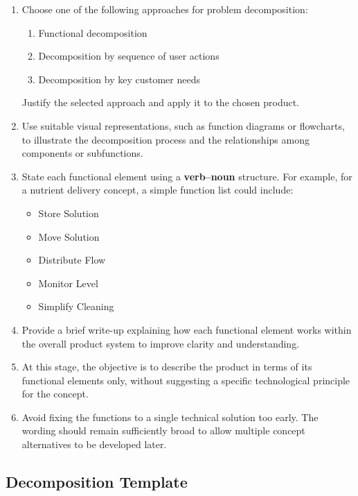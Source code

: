 \begin{enumerate}
    \item Choose one of the following approaches for problem decomposition:
    \begin{enumerate}
        \item Functional decomposition
        \item Decomposition by sequence of user actions
        \item Decomposition by key customer needs
    \end{enumerate}
    Justify the selected approach and apply it to the chosen product.

    \item Use suitable visual representations, such as function diagrams or flowcharts, to illustrate the decomposition process and the relationships among components or subfunctions.

    \item State each functional element using a \textbf{verb--noun} structure. For example, for a nutrient delivery concept, a simple function list could include:
    \begin{itemize}
        \item Store Solution
        \item Move Solution
        \item Distribute Flow
        \item Monitor Level
        \item Simplify Cleaning
    \end{itemize}

    \item Provide a brief write-up explaining how each functional element works within the overall product system to improve clarity and understanding.

    \item At this stage, the objective is to describe the product in terms of its functional elements only, without suggesting a specific technological principle for the concept.

    \item Avoid fixing the functions to a single technical solution too early. The wording should remain sufficiently broad to allow multiple concept alternatives to be developed later.
\end{enumerate}


\subsection{Decomposition Template}

